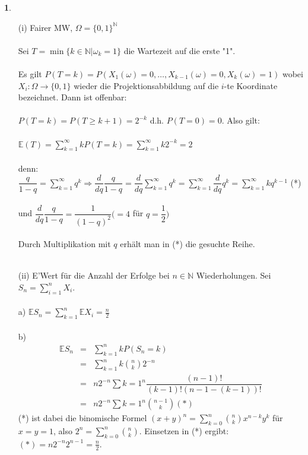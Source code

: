 \documentclass[10pt,a4paper]{report}
\numberwithin{equation}{section}
\numberwithin{figure}{section}
\theoremstyle{plain}
\theoremstyle{definition}
\theoremstyle{plain}
\theoremstyle{definition}
\newtheorem{example}{\protect\examplename}[section]
\theoremstyle{remark}
\theoremstyle{plain}
\theoremstyle{plain}
\theoremstyle{plain}
\theoremstyle{plain}
\theoremstyle{plain}
\providecommand{\examplename}{Beispiel}
\newcommand{\1}{ \mathbb{1} } %
\begin{document}
\begin{example}
  \begin{itemize}
  \item[(i)] Fairer MW, $\Omega=\{0,1\}^{\mathbb{N}}$\\\\
    Sei $T=\min\{k\in \mathbb{N}|\omega_k=1\}$ die Wartezeit auf die erste "1".\\\\
    Es gilt $P(T=k)=P(X_1(\omega)=0,\dots,X_{k-1}(\omega)=0,X_k(\omega)=1)$ wobei $X_i:\Omega \to \{0,1\}$ wieder die Projektionsabbildung auf die $i$-te Koordinate bezeichnet. Dann ist offenbar:\\\\
    $P(T=k)=P(T\geq k+1)=2^{-k}$ d.h. $P(T=0)=0$. Also gilt:\\\\
    $\mathbb{E}(T)=\sum\limits_{k=1}^\infty kP(T=k)=\sum\limits_{k=1}^\infty k2^{-k}=2$\\\\
    denn: $\dfrac{q}{1-q}=\sum\limits_{k=1}^\infty q^k \Rightarrow \dfrac{d}{dq}\dfrac{q}{1-q}=\dfrac{d}{dq}\sum\limits_{k=1}^\infty q^k=\sum\limits_{k=1}^\infty \dfrac{d}{dq} q^k=\sum\limits_{k=1}^\infty kq^{k-1}$ (*)\\\\
    und $\dfrac{d}{dq}\dfrac{q}{1-q}=\dfrac{1}{(1-q)^2} (=4$ für $q=\dfrac{1}{2})$\\\\
    Durch Multiplikation mit $q$ erhält man in (*) die gesuchte Reihe.\\\\
    \item[(ii)] E'Wert für die Anzahl der Erfolge bei $n \in \mathbb{N}$ Wiederholungen. Sei $S_n=\sum\limits_{i=1}^nX_i$.\\\\
    a) $\mathbb{E}S_n=\sum\limits_{k=1}^n\mathbb{E}X_i=\frac{n}{2}$\\\\
    b)\begin{eqnarray*}
      \mathbb{E}S_n&=&\sum\limits_{k=1}^nkP(S_n=k)\\
      &=& \sum\limits_{k=1}^nk\binom{n}{k}2^{-n}\\
      &=& n 2^{-n} \sum\limits{k=1}^n\dfrac{(n-1)!}{(k-1)!(n-1-(k-1))!}\\
      &=& n 2^{-n} \sum\limits{k=1}^n \binom{n-1}{k} (*)
    \end{eqnarray*}
    (*) ist dabei die binomische Formel $(x+y)^n=\sum\limits_{k=0}^n\binom{n}{k}x^{n-k}y^k$ für $x=y=1$, also $2^n=\sum\limits_{k=0}^n\binom{n}{k}$. Einsetzen in (*) ergibt: $(*)=n2^{-n}2^{n-1}=\frac{n}{2}$.\\\\
  \end{itemize}

\end{example}
\end{document}
